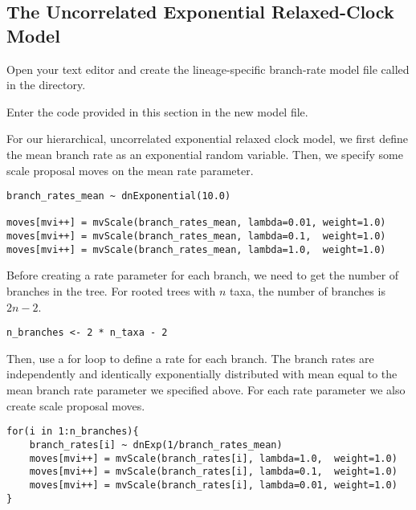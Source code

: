 \bigskip

\subsection{The Uncorrelated Exponential Relaxed-Clock Model}\label{subsect:RB-ModelUCExp}

{\begin{framed}
Open your text editor and create the lineage-specific branch-rate model file called {\textcolor{red}{}} in the  directory.

Enter the \Rev code provided in this section in the new model file.
\end{framed}}

For our hierarchical, uncorrelated exponential relaxed clock model, we first define the mean branch rate as an exponential random variable. Then, we specify some scale proposal moves on the mean rate parameter.
{\tt \begin{snugshade*}
\begin{lstlisting}
branch_rates_mean ~ dnExponential(10.0)

moves[mvi++] = mvScale(branch_rates_mean, lambda=0.01, weight=1.0)
moves[mvi++] = mvScale(branch_rates_mean, lambda=0.1,  weight=1.0)
moves[mvi++] = mvScale(branch_rates_mean, lambda=1.0,  weight=1.0)
\end{lstlisting}
\end{snugshade*}}

Before creating a rate parameter for each branch, we need to get the number of branches in the tree. For rooted trees with $n$ taxa, the number of branches is $2n-2$.

{\tt \begin{snugshade*}
\begin{lstlisting}
n_branches <- 2 * n_taxa - 2
\end{lstlisting}
\end{snugshade*}}

Then, use a for loop to define a rate for each branch.
The branch rates are independently and identically exponentially distributed with mean equal to the mean branch rate parameter we specified above.
For each rate parameter we also create scale proposal moves.
{\tt \begin{snugshade*}
\begin{lstlisting}
for(i in 1:n_branches){
    branch_rates[i] ~ dnExp(1/branch_rates_mean)
    moves[mvi++] = mvScale(branch_rates[i], lambda=1.0,  weight=1.0)
    moves[mvi++] = mvScale(branch_rates[i], lambda=0.1,  weight=1.0)
    moves[mvi++] = mvScale(branch_rates[i], lambda=0.01, weight=1.0)
}
\end{lstlisting}
\end{snugshade*}}

